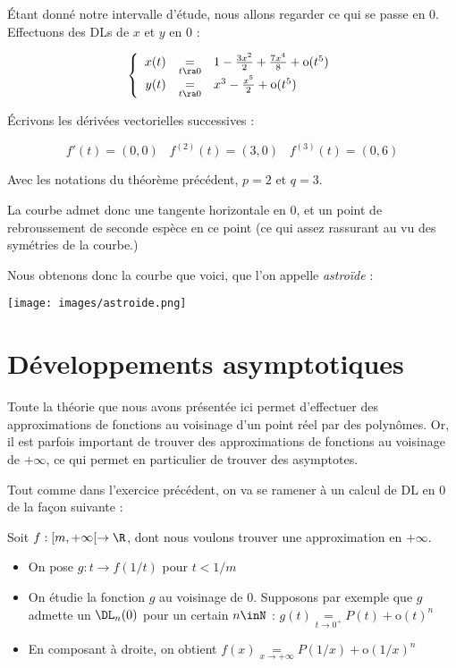 \documentclass[12pt]{article}
\begin{document}
\begin{demo}
\begin{description}
\'Etant donn\'e notre intervalle d'\'etude, nous allons regarder ce qui se
passe en 0. Effectuons des DLs de $x$ et $y$ en 0 :

$$
\left\{ \begin{array}{rcl}
x(t)&\underset{t\ra 0}{=}&1-\frac{3x^2}{2}+\frac{7x^4}{8}+\text{o}(t^5)\\
y(t)&\underset{t\ra 0}{=}&x^3-\frac{x^5}{2}+\text{o}(t^5)\\
\end{array}\right.
$$

\'Ecrivons les d\'eriv\'ees vectorielles successives :

$$f'(t)=(0,0)\;\;\;f^{(2)}(t)=(3,0)\;\;\;f^{(3)}(t)=(0,6)$$

Avec les notations du th\'eor\`eme pr\'ec\'edent, $p=2$ et $q=3$.

La courbe admet donc une tangente horizontale en $0$, et un point de
rebroussement de seconde esp\`ece en ce point (ce qui assez rassurant au vu
des symétries de la courbe.)

  \end{description}

Nous obtenons donc la courbe que voici, que l'on appelle \emph{astroïde} :

\begin{center}
\texttt{[image: images/astroide.png]}

\end{center}

\end{demo}


\section{Développements asymptotiques}

Toute la théorie que nous avons présentée ici permet d'effectuer des
approximations de fonctions au voisinage d'un point réel par des
polynômes. Or, il est parfois important de trouver des approximations de
fonctions au voisinage de $+\infty$, ce qui permet en particulier de
trouver des asymptotes.

Tout comme dans l'exercice précédent, on va se ramener à un calcul de DL en
0 de la façon suivante :

\smallskip
Soit $f:[m,+\infty[ \rightarrow \R$, dont nous voulons trouver une
    approximation en $+\infty$.


\begin{itemize}


\item On pose $g:t \rightarrow f(1/t)$ pour $t<1/m$

\item On étudie la fonction $g$ au voisinage de 0. Supposons par exemple
  que $g$ admette un $\DL_n(0)$ pour un certain $n\inN$ :
  $g(t)\underset{t\rightarrow 0^+}{=}P(t)+\text{o}(t)^n$

\item En composant à droite, on obtient   $f(x)\underset{x\rightarrow +\infty}{=}P(1/x)+\text{o}(1/x)^n$

\end{itemize}
\end{document}
